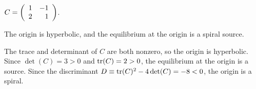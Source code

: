 \documentclass{ximera}
\begin{document}
\begin{exercise}  \label{E:PQa}
$C = \left(\begin{array}{rr} 1 & -1\\ 2 &1\end{array}\right)$.

\begin{solution}
\ans The origin is hyperbolic, and the equilibrium at the origin
is a spiral source.

\soln The trace and determinant of $C$ are both nonzero, so the origin
is hyperbolic.  Since $\det(C) = 3 > 0$ and ${\rm tr}(C) = 2 > 0$,
the equilibrium at the origin is a source.  Since the discriminant
$D \equiv {\rm tr}(C)^2 - 4\det(C) = -8 < 0$, the origin is a spiral.

\end{solution}
\end{exercise}
\end{document}
